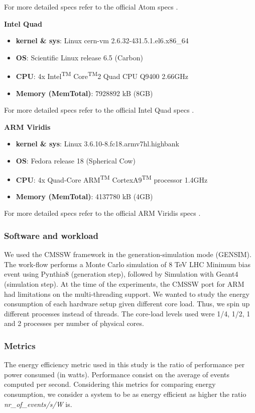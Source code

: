 For more detailed specs refer to the official Atom specs \cite{atom_specs}.

\vspace{10mm}
\textbf{Intel Quad}
\begin{itemize}
  \item[] \textbf{kernel \& sys}:  Linux cern-vm 2.6.32-431.5.1.el6.x86\_64
  \item[] \textbf{OS}: Scientific Linux release 6.5 (Carbon)
  \item[] \textbf{CPU}:    4x Intel\textsuperscript{TM} Core\textsuperscript{TM}2 Quad CPU  Q9400  \@ 2.66GHz
  \item[] \textbf{Memory  (MemTotal)}:        7928892 kB (8GB)
\end{itemize}

For more detailed specs refer to the official Intel Quad specs \cite{quad_specs}.

\vspace{10mm}
\textbf{ARM Viridis}
\begin{itemize}
  \item[] \textbf{kernel \& sys}:  Linux  3.6.10-8.fc18.armv7hl.highbank
  \item[] \textbf{OS}: Fedora release 18 (Spherical Cow)
  \item[] \textbf{CPU}:    4x Quad-Core ARM\textsuperscript{TM} CortexA9\textsuperscript{TM} processor \@1.4GHz
  \item[] \textbf{Memory  (MemTotal)}:        4137780 kB (4GB) 
\end{itemize}

For more detailed specs refer to the official ARM Viridis specs \cite{viridis_specs}.


\subsubsection*{Software and workload}
We used the CMSSW framework in the generation-simulation mode (GEN\-SIM). The work-flow performs a Monte Carlo simulation of 8 TeV LHC Minimum bias event using Pynthia8 (generation step), followed by Simulation with Geant4 (simulation step).
At the time of the experiments, the CMSSW port for ARM had limitations on the multi-threading support. We wanted to study the energy consumption of each hardware setup given different core load. Thus, we spin up different processes instead of threads. The core-load levels used were 1/4, 1/2, 1 and 2 processes per number of physical cores. 

\subsubsection*{Metrics}
The energy efficiency metric used in this study is the ratio of performance per power consumed (in watts). Performance consist on the average of events computed per second. Considering this metrics for comparing energy consumption, we consider a system to be as energy efficient as higher the ratio \textit{nr\_of\_events/s/W} is.

